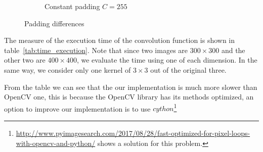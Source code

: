 \begin{figure}[h!]
\begin{subfigure}{0.25\textwidth}
  \centering
  \caption{Constant padding $C = 255$}
\end{subfigure}
 \caption{Padding differences}
\label{fig:padding-strategy}
\end{figure}

\vspace{2cm}

The measure of the execution time of the convolution function is shown in table~\ref{tab:time_execution}. Note that since two images are $300 \times 300$ and the other two are $400 \times 400$, we evaluate the time using one of each dimension. In the same way, we consider only one kernel of $ 3 \times 3$ out of the original three.

From the table we can see that the our implementation is much more slower than OpenCV one, this is because the OpenCV library has its methods optimized, an option to improve our implementation is to use $cython$\footnote{\url{http://www.pyimagesearch.com/2017/08/28/fast-optimized-for-pixel-loops-with-opencv-and-python/} shows a solution for this problem.}

